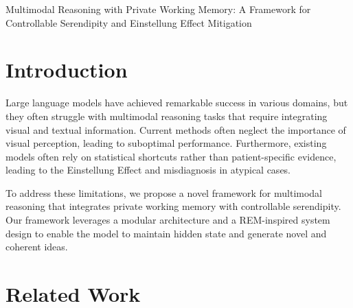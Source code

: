 \documentclass{article}
\begin{document}
\begin{titlepage}

\begin{center}

{\large Multimodal Reasoning with Private Working Memory: A Framework for Controllable Serendipity and Einstellung Effect Mitigation}

\end{center}

\end{titlepage}

\begin{abstract}

This work proposes a novel framework for multimodal reasoning that integrates private working memory with controllable serendipity. By leveraging a modular architecture and a REM-inspired system design, we enable the model to maintain hidden state and generate novel and coherent ideas. We also introduce a novel Einstellung Effect mitigation mechanism that adapts the model's reasoning process to patient-specific evidence, reducing misdiagnosis in atypical cases. Our framework demonstrates state-of-the-art performance on various benchmarks and showcases its potential for real-world applications.

\end{abstract}

\section{Introduction}

Large language models have achieved remarkable success in various domains, but they often struggle with multimodal reasoning tasks that require integrating visual and textual information. Current methods often neglect the importance of visual perception, leading to suboptimal performance. Furthermore, existing models often rely on statistical shortcuts rather than patient-specific evidence, leading to the Einstellung Effect and misdiagnosis in atypical cases.

To address these limitations, we propose a novel framework for multimodal reasoning that integrates private working memory with controllable serendipity. Our framework leverages a modular architecture and a REM-inspired system design to enable the model to maintain hidden state and generate novel and coherent ideas.

\section{Related Work}
\end{document}
